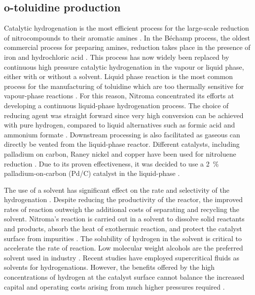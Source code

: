 \subsection{o-toluidine production}

Catalytic hydrogenation is the most efficient process for the large-scale reduction of nitrocompounds to their aromatic amines \cite{cartolano_amines_2004}. In the Béchamp process, the oldest commercial process for preparing amines, reduction takes place in the presence of iron and hydrochloric acid \cite{bowers_toluidines_2000}. This process has now widely been replaced by continuous high pressure catalytic hydrogenation in the vapour or liquid phase, either with or without a solvent. Liquid phase reaction is the most common process for the manufacturing of toluidine which are too thermally sensitive for vapour-phase reactions \cite{cartolano_amines_2004}. For this reason, Nitroma concentrated its efforts at developing a continuous liquid-phase hydrogenation process. The choice of reducing agent was straight forward since very high conversion can be achieved with pure hydrogen, compared to liquid alternatives such as formic acid and ammonium formate \cite{gowda_catalytic_2000}. Downstream processing is also facilitated as gaseous  can directly be vented from the liquid-phase reactor. Different catalysts, including palladium on carbon, Raney nickel and copper have been used for nitroluene reduction \cite{zhao_new_2016}. Due to its proven effectiveness, it was decided to use a \SI{2}{\percent\ww} palladium-on-carbon (Pd/C) catalyst in the liquid-phase \cite{rajadhyaksha_solvent_1986}. 

The use of a solvent has significant effect on the rate and selectivity of the hydrogenation \cite{bowers_toluidines_2000}. Despite reducing the productivity of the reactor, the improved rates of reaction outweigh the additional costs of separating and recycling the solvent. Nitroma's reaction is carried out in a solvent to dissolve solid reactants and products, absorb the heat of exothermic reaction, and protect the catalyst surface from impurities \cite{yao_kinetics_1959}. The solubility of hydrogen in the solvent is critical to accelerate the rate of reaction. Low molecular weight alcohols are the preferred solvent used in industry \cite{cartolano_amines_2004}. Recent studies have employed supercritical fluids as solvents for hydrogenations. However, the benefits offered by the high concentrations of hydrogen at the catalyst surface cannot balance the increased capital and operating costs arising from much higher pressures required \cite{bowers_toluidines_2000}. 

